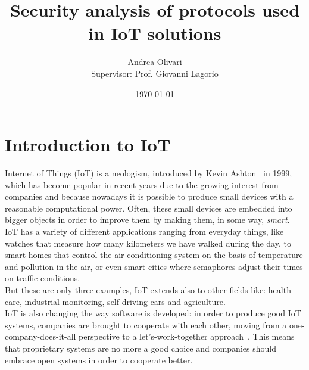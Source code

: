 \documentclass[12pt]{report}
\title{\textbf{Security analysis of protocols used in IoT solutions}}
\author{Andrea Olivari\\[1cm]{\small Supervisor: Prof. Giovanni Lagorio}}
\date{\today}
\begin{document}
\maketitle
\tableofcontents{}


\chapter{Introduction to IoT}
\bigskip
Internet of Things (IoT) is a neologism, introduced by Kevin Ashton~\cite{kevinashton} in 1999, which has become popular in recent years due to the growing interest from companies and because nowadays it is possible to produce small devices with a reasonable computational power.
Often, these small devices are embedded into bigger objects in order to improve them by making them, in some way, \emph{smart}.\\

IoT has a variety of different applications ranging from everyday things, like watches that measure how many kilometers we have walked during the day, to smart homes that control the air conditioning system on the basis of  temperature and pollution in the air, or even smart cities where semaphores adjust their times on traffic conditions.\\
But these are only three examples, IoT extends also to other fields like: health care, industrial monitoring, self driving cars and agriculture.\\

IoT is also changing the way software is developed: in order to produce good IoT systems, companies are brought to cooperate with each other,
moving from a one-company-does-it-all perspective to a let’s-work-together approach~\cite{successiot}.
This means that proprietary systems are no more a good choice and companies should embrace open systems in order to cooperate better.\\
\end{document}
